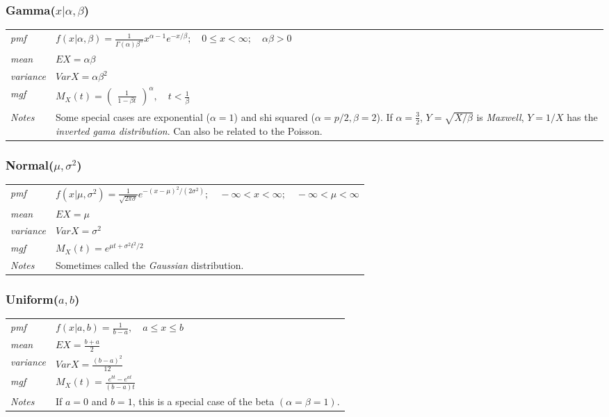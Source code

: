 \documentclass[12pt]{article}
\begin{document}
\subsubsection*{Gamma($x|\alpha, \beta$)\cite[p. 624]{StatisticalInference}}
\begin{tabularx}{\textwidth}{ l X }
\emph{pmf} & $f(x|\alpha, \beta)=\frac{1}{\Gamma(\alpha)\beta^{\alpha}} x^{\alpha - 1}e^{-x/\beta}; \quad 0 \leq x < \infty; \quad \alpha\beta>0$ \\
\emph{mean} & $EX = \alpha\beta$ \\
\emph{variance} & $Var X = \alpha\beta^2$ \\
\emph{mgf} & $M_X(t)= \begin{pmatrix}\frac{1}{1-\beta t}\end{pmatrix}^{\alpha}, \quad t < \frac{1}{\beta}$ \\
\emph{Notes} & Some special cases are exponential ($\alpha = 1$) and shi squared ($\alpha = p/2, \beta = 2$). If $\alpha = \frac{3}{2}$, $Y=\sqrt{X/\beta}$ is \emph{Maxwell}, $Y=1/X$ has the \emph{inverted gama distribution}. Can also be related to the Poisson.\\
\end{tabularx}

\subsubsection*{Normal($\mu, \sigma^2$)\cite[p. 625]{StatisticalInference}}
\begin{tabularx}{\textwidth}{ l X }
\emph{pmf} & $f(x|\mu, \sigma^2)=\frac{1}{\sqrt{2\pi \sigma}}e^{-(x-\mu)^2/(2\sigma^2)}; \quad -\infty < x < \infty; \quad -\infty < \mu < \infty$ \\
\emph{mean} & $EX = \mu$ \\
\emph{variance} & $Var X = \sigma^2$ \\
\emph{mgf} & $M_X(t)= e^{\mu t + \sigma^2t^2/2}$ \\
\emph{Notes} & Sometimes called the \emph{Gaussian} distribution.\\
\end{tabularx}

\subsubsection*{Uniform($a, b$)\cite[p. 626]{StatisticalInference}}
\begin{tabularx}{\textwidth}{ l X }
\emph{pmf} & $f(x|a, b)=\frac{1}{b-a}, \quad a \leq x \leq b$ \\
\emph{mean} & $EX = \frac{b+a}{2}$ \\
\emph{variance} & $Var X = \frac{(b-a)^2}{12}$ \\
\emph{mgf} & $M_X(t)=\frac{e^{bt}-e^{at}}{(b-a)t}$ \\
\emph{Notes} & If $a=0$ and $b=1$, this is a special case of the beta $(\alpha = \beta = 1)$.\\
\end{tabularx}
\end{document}
